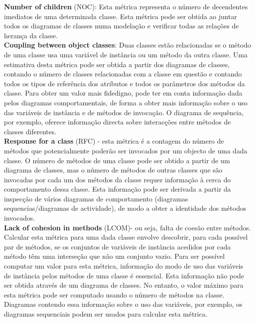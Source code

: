 \textbf{Number of children} (NOC): Esta métrica representa o número de decendentes imediatos de uma determinada classe. Esta métrica pode ser obtida ao juntar todos os diagramas de classes numa modelação \umlS e verificar todas as relações de herança da classe.\\

\textbf{Coupling between object classes}: Duas classes estão relacionadas se o método de uma classe usa uma variável de instância ou um método da outra classe. Uma estimativa desta métrica pode ser obtida a partir dos diagramas de classes, contando o número de classes relacionadas com a classe em questão e contando todos os tipos de referência dos atributos e todos os parâmetros dos métodos da classe. Para obter um valor mais fidedigno, pode ter em conta informação dada pelos diagramas comportamentais, de forma a obter mais informação sobre o uso das variáveis de instância e de métodos de invocação. O diagrama de sequência, por exemplo, oferece informação directa sobre interacções entre métodos de classes diferentes. \\

\textbf{Response for a class} (RFC) - esta métrica é a contagem do número de métodos que potencialmente poderão ser invocados por um objecto de uma dada classe. O número de métodos de uma classe pode ser obtido a partir de um diagrama de classes, mas o número de métodos de outras classes que são invocadas por cada um dos métodos da classe requer informação à cerca do comportamento dessa classe. Esta informação pode ser derivada a partir da inspecção de vários diagramas de comportamento (diagramas sequencias/diagramas de actividade), de modo a obter a identidade dos métodos invocados.\\


\textbf{Lack of cohesion in methods} (LCOM)- ou seja, falta de coesão entre métodos. Calcular esta métrica para uma dada classe envolve descobrir, para cada possível par de métodos, se os conjuntos de variáveis de instância acedidos por cada método têm uma interseção que não um conjunto vazio.
Para ser possível computar um valor para esta métrica, informação do modo de uso das variáveis de instância pelos métodos de uma classe é essencial. Esta informação não pode ser obtida através de um diagrama de classes. No entanto, o valor máximo para esta métrica pode ser computado usando o número de métodos na classe. Diagramas contendo essa informação sobre o uso das variáveis, por exemplo, os diagramas sequenciais podem ser usados para calcular esta métrica.\\

